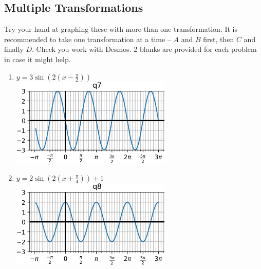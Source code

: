 \documentclass{article}
\begin{document}
\begin{multicols}{2}
\subsection*{Multiple Transformations}
\noindent
Try your hand at graphing these with more than one transformation. It is recommended to take one transformation at a time -- $A$ and $B$ first, then $C$ and finally $D$. Check you work with Desmos. 2 blanks are provided for each problem in case it might help.
\begin{enumerate}
	\item $y=3\sin (2(x-\frac{\pi}{2}))$ \\
	\includegraphics*[width=3in]{q7.png} \\
	\item $y=2\sin (2(x+\frac{\pi}{4})) + 1$ \\
	\includegraphics*[width=3in]{q8.png} \\
\end{enumerate}
\end{multicols}
\end{document}
